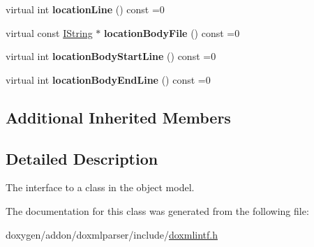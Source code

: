 \begin{DoxyCompactItemize}
\item 
\mbox{\label{class_i_class_a0b739d8c75ca4364048d103f3cbd6407}} 
virtual int {\bfseries location\+Line} () const =0
\item 
\mbox{\label{class_i_class_a27bb881d8684d834d02893de5a8dfda9}} 
virtual const \mbox{\hyperlink{class_i_string}{I\+String}} $\ast$ {\bfseries location\+Body\+File} () const =0
\item 
\mbox{\label{class_i_class_a42c96b64901b45ad60eeba19b8c6615e}} 
virtual int {\bfseries location\+Body\+Start\+Line} () const =0
\item 
\mbox{\label{class_i_class_afc371fbe400695c90a7eb9d1bf39cc29}} 
virtual int {\bfseries location\+Body\+End\+Line} () const =0
\end{DoxyCompactItemize}
\subsection*{Additional Inherited Members}


\subsection{Detailed Description}
The interface to a class in the object model. 

The documentation for this class was generated from the following file\+:\begin{DoxyCompactItemize}
\item 
doxygen/addon/doxmlparser/include/\mbox{\hyperlink{include_2doxmlintf_8h}{doxmlintf.\+h}}\end{DoxyCompactItemize}
